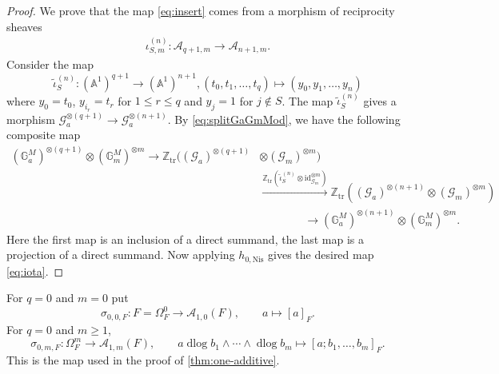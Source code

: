 \documentclass[a4paper,12pt,reqno]{amsart}
\numberwithin{equation}{section}
\theoremstyle{definition}
\newcommand{\Z}{\mathbb{Z}}
\newcommand{\bA}{\mathbb{A}}
\DeclareMathOperator{\dlog}{dlog}
\newcommand{\Id}{\mathrm{id}}
\newcommand{\bcube}{{\overline{\square}}}
\newcommand{\CI}{\operatorname{\mathbf{CI}}}
\newcommand{\Acal}{\mathcal{A}}
\newcommand{\Ztr}{\Z_{\mathrm{tr}}}
\newcommand{\GaMod}{\mathbb{G}_{a}^{M}}
\newcommand{\GmMod}{\mathbb G_m^M}
\newcommand{\Nis}{\mathrm{Nis}}
\newcommand{\Gapair}{\mathcal{G}_a}
\newcommand{\Gmpair}{\mathcal{G}_m}
\begin{document}
\begin{proof}
We prove that the map \eqref{eq:insert} comes from a morphism of reciprocity sheaves
\begin{align}\label{eq:iota}
        \iota_{S,m}^{(n)}: \Acal_{q+1,m}\to \Acal_{n+1,m}.
\end{align}
	Consider the map 
    $$\tilde{\iota}_S^{(n)}: (\bA^1)^{q+1}\to (\bA^1)^{n+1}, (t_0, t_1, \dots, t_q) \mapsto (y_0, y_1, \dots, y_n)$$
    where $y_0 = t_0$, $y_{i_r}=t_r$ for $1\leq r\leq q$ and $y_j=1$ for $j\notin S$.
    The map $\tilde{\iota}_S^{(n)}$ gives a morphism $\Gapair^{\otimes (q+1)}\to \Gapair^{\otimes (n+1)}$.
     By \eqref{eq:splitGaGmMod}, we have the following composite map
    \begin{align}        
    (\GaMod)^{\otimes (q+1)}\otimes(\GmMod)^{\otimes m}
    \to
    \Ztr((\Gapair)^{\otimes (q+1)}&\otimes(\Gmpair)^{\otimes m})\\
    &\xrightarrow{\Ztr(\tilde{\iota}_S^{(n)}\otimes \Id_{\Gmpair}^{\otimes m})}
    \Ztr((\Gapair)^{\otimes (n+1)}\otimes(\Gmpair)^{\otimes m})\\
    &\qquad \qquad\to
    (\GaMod)^{\otimes (n+1)}\otimes(\GmMod)^{\otimes m}.
    \end{align}
    Here the first map is an inclusion of a direct summand, the last map is a projection of a direct summand.
    Now applying $h_{0,\Nis}$ gives the desired map \eqref{eq:iota}.
\end{proof}

\color{black}



For $q=0$ and $m=0$ put
\begin{equation}\label{eq:tau0}
 \sigma_{0,0,F}:F=\Omega_F^0\to\Acal_{1,0}(F),
 \qquad a\mapsto[a]_F.
\end{equation}
For $q=0$ and $m\geq 1$,
\begin{equation}
 \sigma_{0,m,F}:\Omega_F^m\to\Acal_{1,m}(F),
 \qquad a\dlog b_1\wedge\cdots \wedge \dlog b_m\mapsto [a;b_1,\dots,b_m]_F.
\end{equation}
This is the map used in the proof of \autoref{thm:one-additive}.
\end{document}
